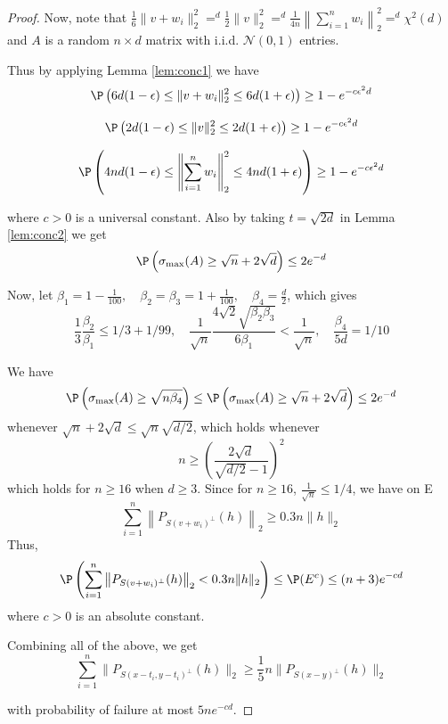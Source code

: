 \begin{proof}
Now, note that $ \frac{1}{6}\|v+w_i\|_2^2 =^d \frac{1}{2}\|v\|_2^2 =^d \frac{1}{4n} \left \| \sum_{i=1}^n w_i \right\|_2^2 =^d \chi^2(d)$ and $A$ is a random $n\times d$ matrix with i.i.d. $\mathcal{N}(0,1)$ entries. 

Thus by applying Lemma \ref{lem:conc1} we have 
\[
\P\left( 6d(1-\epsilon) \leq \|v+w_i\|_2^2 \leq 6d(1+\epsilon) \right) \geq 1 - e^{-c \epsilon^2 d}
\]

\[
\P\left( 2d(1-\epsilon) \leq \|v\|_2^2 \leq 2d(1+\epsilon) \right) \geq 1 - e^{-c \epsilon^2 d}
\]

\[
\P\left( 4nd(1-\epsilon) \leq \left \| \sum_{i=1}^n w_i \right\|_2^2 \leq 4nd(1+\epsilon) \right) \geq 1 - e^{-c \epsilon^2 d}
\]

where $c>0$ is a universal constant. Also by taking $t = \sqrt{2d}$ in Lemma \ref{lem:conc2} we get
\[
\P \left( \sigma_{\text{max}}(A) \geq \sqrt{n} +2\sqrt{d} \right) \leq 2e^{-d}
\]

Now, let $\beta_1 = 1-\frac{1}{100}, \quad \beta_2 = \beta_3 = 1 + \frac{1}{100}, \quad \beta_4 = \frac{d}{2}$, which gives
\[
\frac{1}{3} \frac{\beta_2}{\beta_1} \leq 1/3 +1/99, \quad \frac{1}{\sqrt{n}}\frac{ 4\sqrt{2} \sqrt{\beta_2\beta_3}}{6\beta_1} < \frac{1}{\sqrt{n}}, \quad \frac{\beta_4}{5d} = 1/10
\]

We have
\[
\P  \left(\sigma_{\max} (A) \geq \sqrt{n \beta_4}\right) \leq \P\left( \sigma_{\max} (A) \geq \sqrt{n} + 2\sqrt{d} \right) \leq 2e^{-d}
\]
whenever $\sqrt{n} + 2\sqrt{d} \leq \sqrt{n}\sqrt{d/2}$, which holds whenever
\[
n \geq \left( \frac{2\sqrt{d}}{\sqrt{d/2} -1} \right)^2
\]
which holds for $n \geq 16$ when $d\geq 3$. Since for $n\geq 16$, $\frac{1}{\sqrt{n}} \leq 1/4$, we have on E
\[
\sum_{i=1}^n \left \| P_{S(v+w_i)^\perp}(h)\right \|_2 \geq 0.3 n \|h\|_2
\]
Thus,
\[
\P\left ( \sum_{i=1}^n \left \| P_{S(v+w_i)^\perp}(h)\right \|_2 < 0.3 n \|h\|_2 \right) \leq \P(E^c) \leq (n+3)e^{-cd}
\]
where $c>0$ is an absolute constant. 

Combining all of the above, we get
\[
\sum_{i=1}^n \| P_{S(x-t_i, y-t_i)^\perp}(h) \|_2 \geq \frac{1}{5}n\|P_{S(x-y)^\perp}(h)\|_2
\]

with probability of failure at most $5ne^{-cd}$. 


 \end{proof}


